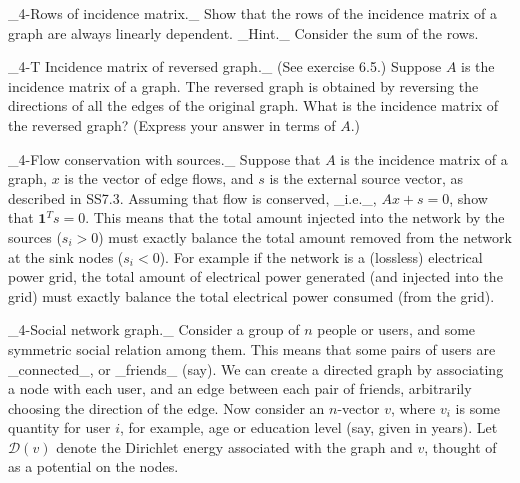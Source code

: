 _4-Rows of incidence matrix._ Show that the rows of the incidence matrix of a graph are always linearly dependent. _Hint._ Consider the sum of the rows.

_4-T Incidence matrix of reversed graph._ (See exercise 6.5.) Suppose \(A\) is the incidence matrix of a graph. The reversed graph is obtained by reversing the directions of all the edges of the original graph. What is the incidence matrix of the reversed graph? (Express your answer in terms of \(A\).)

_4-Flow conservation with sources._ Suppose that \(A\) is the incidence matrix of a graph, \(x\) is the vector of edge flows, and \(s\) is the external source vector, as described in SS7.3. Assuming that flow is conserved, _i.e._, \(Ax+s=0\), show that \(\mathbf{1}^{T}s=0\). This means that the total amount injected into the network by the sources (\(s_{i}>0\)) must exactly balance the total amount removed from the network at the sink nodes (\(s_{i}<0\)). For example if the network is a (lossless) electrical power grid, the total amount of electrical power generated (and injected into the grid) must exactly balance the total electrical power consumed (from the grid).

_4-Social network graph._ Consider a group of \(n\) people or users, and some symmetric social relation among them. This means that some pairs of users are _connected_, or _friends_ (say). We can create a directed graph by associating a node with each user, and an edge between each pair of friends, arbitrarily choosing the direction of the edge. Now consider an \(n\)-vector \(v\), where \(v_{i}\) is some quantity for user \(i\), for example, age or education level (say, given in years). Let \(\mathcal{D}(v)\) denote the Dirichlet energy associated with the graph and \(v\), thought of as a potential on the nodes.

